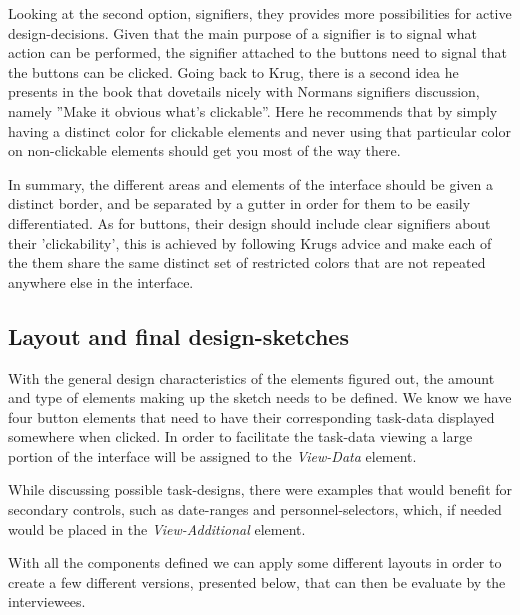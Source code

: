 {	Looking at the second option, signifiers, they provides more possibilities
	for active design-decisions. Given that the main purpose of a signifier is to
	signal what action can be performed, the signifier attached to the buttons
	need to signal that the buttons can be clicked. Going back to Krug, there is
	a second idea he presents in the book that dovetails nicely with Normans
	signifiers discussion, namely ''Make it obvious what's clickable''. Here he
	recommends that by simply having a distinct color for clickable elements and
	never using that particular color on non-clickable elements should get you
	most of the way there.

	In summary, the different areas and elements of the interface should be given
	a distinct border, and be separated by a gutter in order for them to be
	easily differentiated. As for buttons, their design should include clear
	signifiers about their 'clickability', this is achieved by following Krugs
	advice and make each of the them share the same distinct set of restricted
	colors that are not repeated anywhere else in the interface.

	\newpage
	\subsection{Layout and final design-sketches}

	With the general design characteristics of the elements figured out, the
	amount and type of elements making up the sketch needs to be defined. We know
	we have four button elements that need to have their corresponding task-data
	displayed somewhere when clicked. In order to facilitate the task-data
	viewing a large portion of the interface will be assigned to the
	\textit{View-Data} element.

	While discussing possible task-designs, there were examples that would
	benefit for secondary controls, such as date-ranges and personnel-selectors,
	which, if needed would be placed in the \textit{View-Additional} element.

	With all the components defined we can apply some different layouts in order
	to create a few different versions, presented below, that can then be
	evaluate by the interviewees.

}
